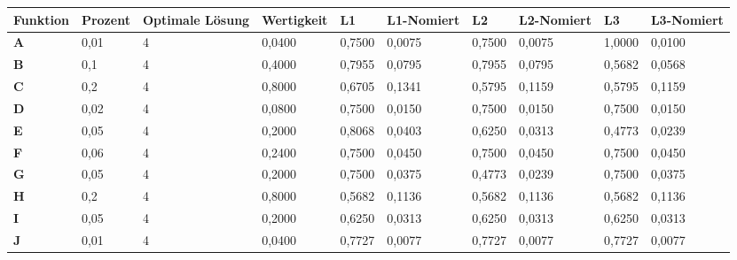 \documentclass[10pt,a4paper]{article}
\begin{document}
\hspace*{-0.41in} %
\begin{tabular}{>{\bfseries}p{1.5cm} p{1.5cm} p{1.5cm} p{1.5cm} p{1.5cm} p{1.5cm} p{1.5cm} p{1.5cm} p{1.5cm} p{1.5cm}}
    \toprule
    Funktion                       & Prozent        & Optimale Lösung & Wertigkeit      & L1     & L1-Nomiert      & L2     & L2-Nomiert      & L3     & L3-Nomiert      \\
    \midrule
    A                              & 0,01           & 4               & 0,0400          & 0,7500 & 0,0075          & 0,7500 & 0,0075          & 1,0000 & 0,0100          \\
    B                              & 0,1            & 4               & 0,4000          & 0,7955 & 0,0795          & 0,7955 & 0,0795          & 0,5682 & 0,0568          \\
    C                              & 0,2            & 4               & 0,8000          & 0,6705 & 0,1341          & 0,5795 & 0,1159          & 0,5795 & 0,1159          \\
    D                              & 0,02           & 4               & 0,0800          & 0,7500 & 0,0150          & 0,7500 & 0,0150          & 0,7500 & 0,0150          \\
    E                              & 0,05           & 4               & 0,2000          & 0,8068 & 0,0403          & 0,6250 & 0,0313          & 0,4773 & 0,0239          \\
    F                              & 0,06           & 4               & 0,2400          & 0,7500 & 0,0450          & 0,7500 & 0,0450          & 0,7500 & 0,0450          \\
    G                              & 0,05           & 4               & 0,2000          & 0,7500 & 0,0375          & 0,4773 & 0,0239          & 0,7500 & 0,0375          \\
    H                              & 0,2            & 4               & 0,8000          & 0,5682 & 0,1136          & 0,5682 & 0,1136          & 0,5682 & 0,1136          \\
    I                              & 0,05           & 4               & 0,2000          & 0,6250 & 0,0313          & 0,6250 & 0,0313          & 0,6250 & 0,0313          \\
    J                              & 0,01           & 4               & 0,0400          & 0,7727 & 0,0077          & 0,7727 & 0,0077          & 0,7727 & 0,0077          \\

\end{tabular}
\end{document}
